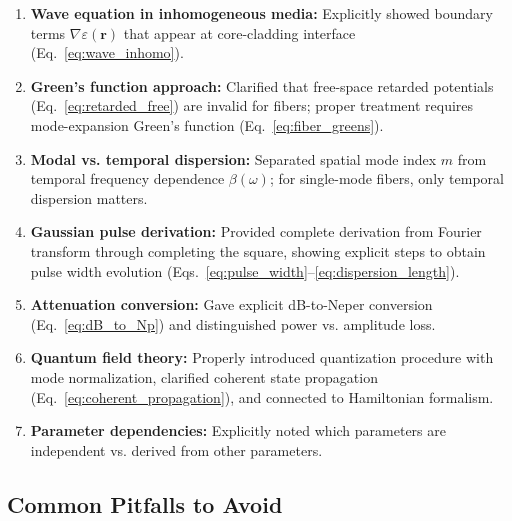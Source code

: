 \documentclass[12pt,a4paper]{article}
\begin{document}
\begin{enumerate}[leftmargin=*]
\item \textbf{Wave equation in inhomogeneous media:} Explicitly showed boundary terms $\nabla \varepsilon(\mathbf{r})$ that appear at core-cladding interface (Eq.~\ref{eq:wave_inhomo}).

\item \textbf{Green's function approach:} Clarified that free-space retarded potentials (Eq.~\ref{eq:retarded_free}) are invalid for fibers; proper treatment requires mode-expansion Green's function (Eq.~\ref{eq:fiber_greens}).

\item \textbf{Modal vs. temporal dispersion:} Separated spatial mode index $m$ from temporal frequency dependence $\beta(\omega)$; for single-mode fibers, only temporal dispersion matters.

\item \textbf{Gaussian pulse derivation:} Provided complete derivation from Fourier transform through completing the square, showing explicit steps to obtain pulse width evolution (Eqs.~\ref{eq:pulse_width}--\ref{eq:dispersion_length}).

\item \textbf{Attenuation conversion:} Gave explicit dB-to-Neper conversion (Eq.~\ref{eq:dB_to_Np}) and distinguished power vs. amplitude loss.

\item \textbf{Quantum field theory:} Properly introduced quantization procedure with mode normalization, clarified coherent state propagation (Eq.~\ref{eq:coherent_propagation}), and connected to Hamiltonian formalism.

\item \textbf{Parameter dependencies:} Explicitly noted which parameters are independent vs. derived from other parameters.
\end{enumerate}

\subsection{Common Pitfalls to Avoid}
\end{document}
